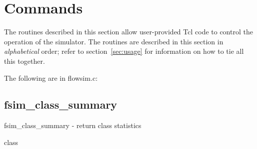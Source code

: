 \documentclass{article}
\begin{document}
\section{Commands}
The routines described in this section allow user-provided Tcl code to
control the operation of the simulator.  The routines are described in
this section in \emph{alphabetical} order; refer to
section~\ref{sec:usage} for information on how to tie all this
together.

The following are in flowsim.c:

\subsection{fsim\_class\_summary}
\begin{description}

\NAME fsim\_class\_summary - return class statistics

\SYNOPSIS {} class

\DESCRIPTION


\end{description}
\end{document}
